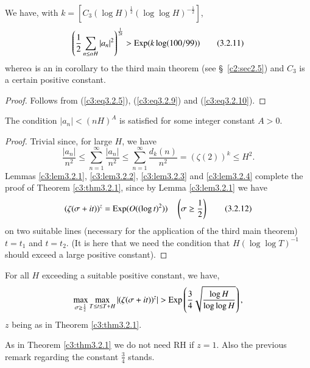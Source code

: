 \begin{sublemma}\label{c3:lem3.2.3}
We have, with $k = [C_3 (\log H)^{\frac{1}{2}} (\log \log H)^{-\frac{1}{2}}]$,
\begin{equation*}
\left(\frac{1}{2} \sum\limits_{n\leq \alpha H} |a_n|^2 \right)^{\frac{1}{2k}} >\operatorname{Exp} (k \log (100/99)) \tag{3.2.11}\label{c3:eq3.2.11}
\end{equation*}
where\pageoriginale $\alpha$ is an in corollary to the third main theorem (see \S\ \ref{c2:sec2.5}) and $C_3$ is a certain positive constant.
\end{sublemma}

\begin{proof}
Follows from (\ref{c3:eq3.2.5}), (\ref{c3:eq3.2.9}) and (\ref{c3:eq3.2.10}).
\end{proof}

\begin{sublemma}\label{c3:lem3.2.4}
The condition $|a_n| <(nH)^A$ is satisfied for some integer constant $A >0$.
\end{sublemma}

\begin{proof}
Trivial since, for large $H$, we have
$$
\frac{|a_n|}{n^2} \leq \sum\limits^\infty_{n=1}  \frac{|a_n|}{n^2} \leq \sum\limits^{\infty}_{n=1} \frac{d_k (n)}{n^2} = (\zeta(2))^k \leq H^2. 
$$
Lemmas \ref{c3:lem3.2.1}, \ref{c3:lem3.2.2}, \ref{c3:lem3.2.3} and \ref{c3:lem3.2.4} complete the proof of Theorem \ref{c3:thm3.2.1}, since by Lemma \ref{c3:lem3.2.1} we have
\begin{equation*}
(\zeta( \sigma + it))^z = \operatorname{Exp} (O((\log t)^2)) \quad \left(\sigma \geq \frac{1}{2} \right) 
\tag{3.2.12}\label{c3:eq3.2.12}
\end{equation*}
on two suitable lines (necessary for the application of the third main theorem) $t =t_1$ and $t = t_2$. (It is here that we need the condition that $H(\log \log T)^{-1}$ should exceed a large positive constant).
\end{proof}

\begin{theorem}[On RH]\label{c3:thm3.2.2}
For all $H$ exceeding a suitable positive constant, we have,
$$
\max\limits_{\sigma \geq \frac{1}{2}} \max\limits_{T \leq t \leq T + H} |(\zeta(\sigma + it))^z| > \operatorname{Exp} \left(\frac{3}{4} \sqrt{\frac{\log H}{\log \log H}} \right),
$$
$z$ being as in Theorem \ref{c3:thm3.2.1}. 
\end{theorem}

\begin{remark*}
As in Theorem \ref{c3:thm3.2.1} we do not need RH if $z =1$. Also the previous remark regarding the constant $\frac{3}{4}$ stands. 
\end{remark*}

